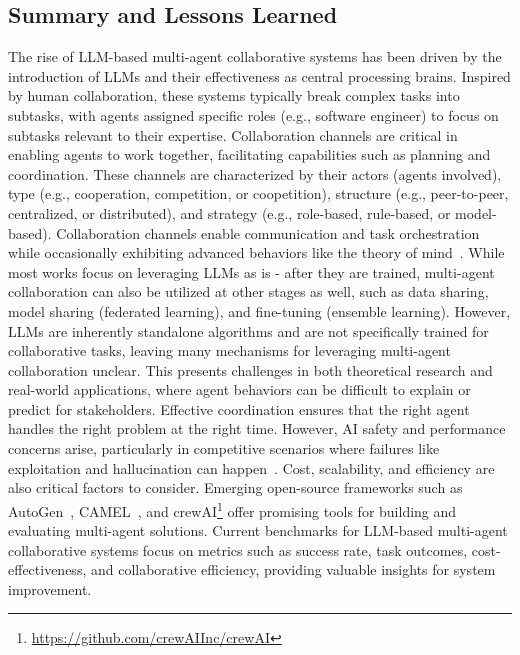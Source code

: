 \documentclass[acmsmall,nonacm]{acmart}
\begin{document}
    \subsection{Summary and Lessons Learned}
        The rise of LLM-based multi-agent collaborative systems has been driven by the introduction of LLMs and their effectiveness as central processing brains. Inspired by human collaboration, these systems typically break complex tasks into subtasks, with agents assigned specific roles (e.g., software engineer) to focus on subtasks relevant to their expertise. Collaboration channels are critical in enabling agents to work together, facilitating capabilities such as planning and coordination. These channels are characterized by their actors (agents involved), type (e.g., cooperation, competition, or coopetition), structure (e.g., peer-to-peer, centralized, or distributed), and strategy (e.g., role-based, rule-based, or model-based).  Collaboration channels enable communication and task orchestration while occasionally exhibiting advanced behaviors like the theory of mind~\cite{li-etal-2023-theory,abdelnabi2024cooperation}. While most works focus on leveraging LLMs as is - after they are trained, multi-agent collaboration can also be utilized at other stages as well, such as data sharing, model sharing (federated learning), and fine-tuning (ensemble learning). However, LLMs are inherently standalone algorithms and are not specifically trained for collaborative tasks, leaving many mechanisms for leveraging multi-agent collaboration unclear. This presents challenges in both theoretical research and real-world applications, where agent behaviors can be difficult to explain or predict for stakeholders. Effective coordination ensures that the right agent handles the right problem at the right time. However, AI safety and performance concerns arise, particularly in competitive scenarios where failures like exploitation and hallucination can happen~\cite{zhang-etal-2024-psysafe,davidson2024evaluating,chen-etal-2024-llmarena}. Cost, scalability, and efficiency are also critical factors to consider. Emerging open-source frameworks such as AutoGen~\cite{wu2024autogen}, CAMEL~\cite{li2023camel}, and crewAI\footnote{\url{https://github.com/crewAIInc/crewAI}} offer promising tools for building and evaluating multi-agent solutions. Current benchmarks for LLM-based multi-agent collaborative systems focus on metrics such as success rate, task outcomes, cost-effectiveness, and collaborative efficiency, providing valuable insights for system improvement.
\end{document}
